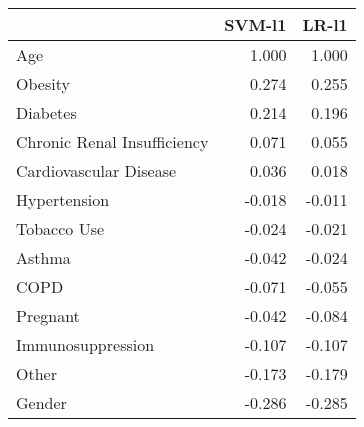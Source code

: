 \begin{tabular}{lrr}
\toprule
{} &  SVM-l1 &  LR-l1 \\
\midrule
Age                         &   1.000 &  1.000 \\
Obesity                     &   0.274 &  0.255 \\
Diabetes                    &   0.214 &  0.196 \\
Chronic Renal Insufficiency &   0.071 &  0.055 \\
Cardiovascular Disease      &   0.036 &  0.018 \\
Hypertension                &  -0.018 & -0.011 \\
Tobacco Use                 &  -0.024 & -0.021 \\
Asthma                      &  -0.042 & -0.024 \\
COPD                        &  -0.071 & -0.055 \\
Pregnant                    &  -0.042 & -0.084 \\
Immunosuppression           &  -0.107 & -0.107 \\
Other                       &  -0.173 & -0.179 \\
Gender                      &  -0.286 & -0.285 \\
\bottomrule
\end{tabular}
